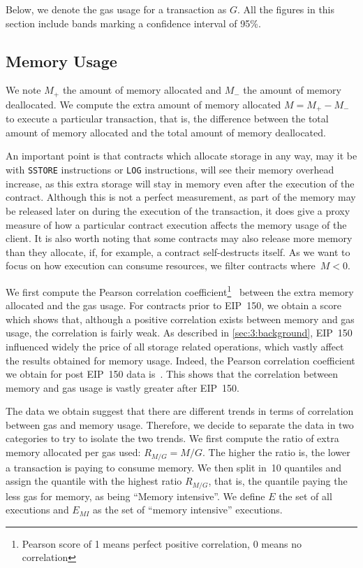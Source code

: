 Below, we denote the gas usage for a transaction as $G$. All the figures in this section include bands marking a confidence interval of 95\%.

\subsection{Memory Usage}
 We note $M_{+}$ the amount of memory allocated and $M_{-}$ the amount of memory deallocated. We compute the extra amount of memory allocated $M = M_{+} - M_{-}$ to execute a particular transaction, that is, the difference between the total amount of memory allocated and the total amount of memory deallocated.

An important point is that contracts which allocate storage in any way, may it be with \lstinline{SSTORE} instructions or \lstinline{LOG} instructions, will see their memory overhead increase, as this extra storage will stay in memory even after the execution of the contract. Although this is not a perfect measurement, as part of the memory may be released later on during the execution of the transaction, it does give a proxy measure of how a particular contract execution affects the memory usage of the client. It is also worth noting that some contracts may also release more memory than they allocate, if, for example, a contract self-destructs itself. As we want to focus on how execution can consume resources, we filter contracts where~$M < 0$.

We first compute the Pearson correlation coefficient\footnote{Pearson score of 1 means perfect positive correlation, 0 means no correlation}~\cite{boslaugh2012statistics} between the extra memory allocated and the gas usage. For contracts prior to  EIP~150, we obtain a score  which shows that, although a positive correlation exists between memory and gas usage, the correlation is fairly weak. As described in \autoref{sec:3:background}, EIP~150 influenced widely the price of all storage related operations, which vastly affect the results obtained for memory usage. Indeed, the Pearson correlation coefficient we obtain for post EIP~150 data is~. This shows that the correlation between memory and gas usage is vastly greater after EIP~150.

The data we obtain suggest that there are different trends in terms of correlation between gas and memory usage. Therefore, we decide to separate the data in two categories to try to isolate the two trends. We first compute the ratio of extra memory allocated per gas used: $R_{M/G} = M / G$. The higher the ratio is, the lower a transaction is paying to consume memory. We then split in~10 quantiles and assign the quantile with the highest ratio $R_{M/G}$, that is, the quantile paying the less gas for memory, as being ``Memory intensive''. We define $E$ the set of all executions and $E_{MI}$ as the set of ``memory intensive'' executions.

